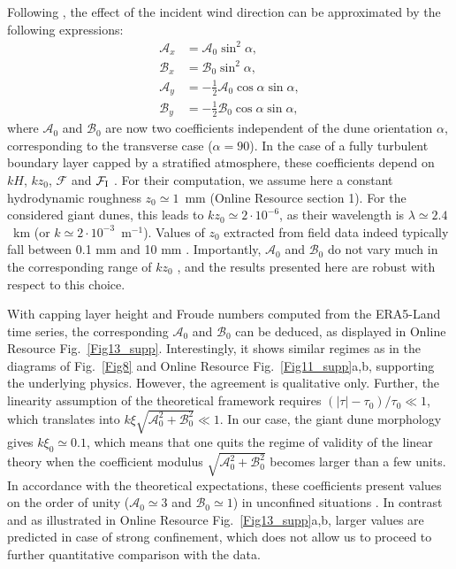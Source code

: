 Following \citet{Andreotti2012}, the effect of the incident wind direction can be approximated by the following expressions:
%
\begin{align}
  \mathcal{A}_{x} & = \mathcal{A}_{0}\sin^{2}\alpha, \\
  \mathcal{B}_{x} & = \mathcal{B}_{0}\sin^{2}\alpha, \\
  \mathcal{A}_{y} & = -\displaystyle\frac{1}{2}\mathcal{A}_{0}\cos\alpha \sin\alpha, \\
  \mathcal{B}_{y} & = -\displaystyle\frac{1}{2}\mathcal{B}_{0}\cos\alpha \sin\alpha,
\end{align}
%
where $\mathcal{A}_{0}$ and $\mathcal{B}_{0}$ are now two coefficients independent of the dune orientation $\alpha$, corresponding to the transverse case ($\alpha=90$). In the case of a fully turbulent boundary layer capped by a stratified atmosphere, these coefficients depend on $k H$, $k z_{0}$, $\mathcal{F}$ and $\mathcal{F}_{\textup{I}}$ \citep{Andreotti2009}. For their computation, we assume here a constant hydrodynamic roughness $z_{0} \simeq 1$~mm (Online Resource section 1). For the considered giant dunes, this leads to $k z_{0} \simeq 2 \cdot 10^{-6}$, as their wavelength is $\lambda \simeq 2.4$~km (or $k \simeq 2 \cdot 10^{-3}$~m$^{-1}$). Values of $z_{0}$ extracted from field data indeed typically fall between 0.1 mm and 10 mm \citep{Sherman2008, Field2018}. Importantly, $\mathcal{A}_{0}$ and $\mathcal{B}_{0}$ do not vary much in the corresponding range of $k z_{0}$ \citep{Fourriere2010}, and the results presented here are robust with respect to this choice.

With capping layer height and Froude numbers computed from the ERA5-Land time series, the corresponding $\mathcal{A}_{0}$ and $\mathcal{B}_{0}$ can be deduced, as displayed in Online Resource Fig.~\ref{Fig13_supp}. Interestingly, it shows similar regimes as in the diagrams of Fig.~\ref{Fig8} and Online Resource Fig.~\ref{Fig11_supp}a,b, supporting the underlying physics. However, the agreement is qualitative only. Further, the linearity assumption of the theoretical framework requires $\left(\vert \tau \vert - \tau_{0}\right)/\tau_{0} \ll 1$, which translates into $k\xi\sqrt{\mathcal{A}_{0}^{2} + \mathcal{B}_{0}^{2}} \ll 1$. In our case, the giant dune morphology gives $k\xi_0 \simeq 0.1$, which means that one quits the regime of validity of the linear theory when the coefficient modulus $\sqrt{\mathcal{A}_{0}^{2} + \mathcal{B}_{0}^{2}}$ becomes larger than a few units. In accordance with the theoretical expectations, these coefficients present values on the order of unity ($\mathcal{A}_{0} \simeq 3$ and $\mathcal{B}_{0} \simeq 1$) in unconfined situations \citep{Claudin2013, Lu2021}. In contrast and as illustrated in Online Resource Fig.~\ref{Fig13_supp}a,b, larger values are predicted in case of strong confinement, which does not allow us to proceed to further quantitative comparison with the data.

